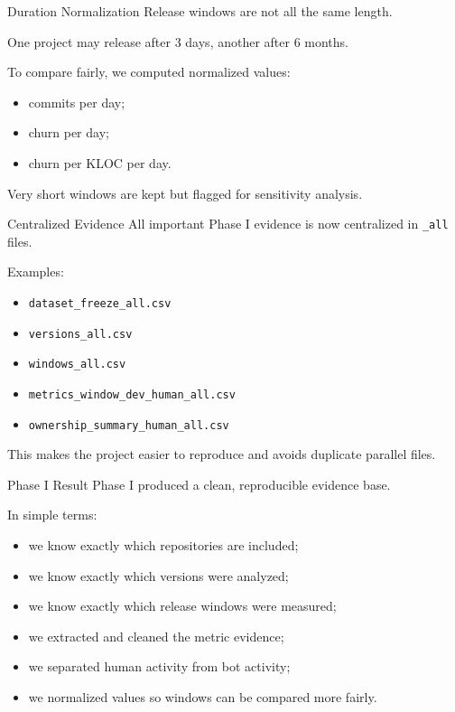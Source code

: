 \documentclass[aspectratio=169,11pt]{beamer}
\begin{document}
\begin{frame}{Duration Normalization}
  Release windows are not all the same length.

  \vspace{0.2cm}
  One project may release after 3 days, another after 6 months.

  \vspace{0.3cm}
  To compare fairly, we computed normalized values:
  \begin{itemize}
    \item commits per day;
    \item churn per day;
    \item churn per KLOC per day.
  \end{itemize}

  \vspace{0.3cm}
  Very short windows are kept but flagged for sensitivity analysis.
\end{frame}

\begin{frame}{Centralized Evidence}
  All important Phase I evidence is now centralized in \texttt{\_all} files.

  \vspace{0.2cm}
  Examples:
  \begin{itemize}
    \item \texttt{dataset\_freeze\_all.csv}
    \item \texttt{versions\_all.csv}
    \item \texttt{windows\_all.csv}
    \item \texttt{metrics\_window\_dev\_human\_all.csv}
    \item \texttt{ownership\_summary\_human\_all.csv}
  \end{itemize}

  \vspace{0.3cm}
  This makes the project easier to reproduce and avoids duplicate parallel files.
\end{frame}

\begin{frame}{Phase I Result}
  Phase I produced a clean, reproducible evidence base.

  \vspace{0.3cm}
  In simple terms:
  \begin{itemize}
    \item we know exactly which repositories are included;
    \item we know exactly which versions were analyzed;
    \item we know exactly which release windows were measured;
    \item we extracted and cleaned the metric evidence;
    \item we separated human activity from bot activity;
    \item we normalized values so windows can be compared more fairly.
  \end{itemize}
\end{frame}
\end{document}
